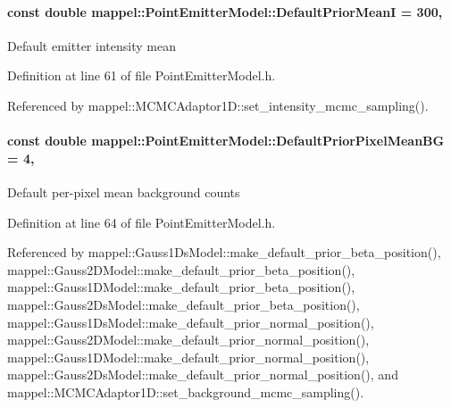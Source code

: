 \paragraph[{\texorpdfstring{Default\+Prior\+MeanI}{DefaultPriorMeanI}}]{\setlength{\rightskip}{0pt plus 5cm}const double mappel\+::\+Point\+Emitter\+Model\+::\+Default\+Prior\+MeanI = 300\hspace{0.3cm}{\ttfamily [static]}, {\ttfamily [inherited]}}\hypertarget{classmappel_1_1PointEmitterModel_a607fcdea787b0cc3c6ac8804d378d1b1}{}\label{classmappel_1_1PointEmitterModel_a607fcdea787b0cc3c6ac8804d378d1b1}
Default emitter intensity mean 

Definition at line 61 of file Point\+Emitter\+Model.\+h.



Referenced by mappel\+::\+M\+C\+M\+C\+Adaptor1\+D\+::set\+\_\+intensity\+\_\+mcmc\+\_\+sampling().

\paragraph[{\texorpdfstring{Default\+Prior\+Pixel\+Mean\+BG}{DefaultPriorPixelMeanBG}}]{\setlength{\rightskip}{0pt plus 5cm}const double mappel\+::\+Point\+Emitter\+Model\+::\+Default\+Prior\+Pixel\+Mean\+BG = 4\hspace{0.3cm}{\ttfamily [static]}, {\ttfamily [inherited]}}\hypertarget{classmappel_1_1PointEmitterModel_a72efb3ee01fa548683d510288266fea5}{}\label{classmappel_1_1PointEmitterModel_a72efb3ee01fa548683d510288266fea5}
Default per-\/pixel mean background counts 

Definition at line 64 of file Point\+Emitter\+Model.\+h.



Referenced by mappel\+::\+Gauss1\+Ds\+Model\+::make\+\_\+default\+\_\+prior\+\_\+beta\+\_\+position(), mappel\+::\+Gauss2\+D\+Model\+::make\+\_\+default\+\_\+prior\+\_\+beta\+\_\+position(), mappel\+::\+Gauss1\+D\+Model\+::make\+\_\+default\+\_\+prior\+\_\+beta\+\_\+position(), mappel\+::\+Gauss2\+Ds\+Model\+::make\+\_\+default\+\_\+prior\+\_\+beta\+\_\+position(), mappel\+::\+Gauss1\+Ds\+Model\+::make\+\_\+default\+\_\+prior\+\_\+normal\+\_\+position(), mappel\+::\+Gauss2\+D\+Model\+::make\+\_\+default\+\_\+prior\+\_\+normal\+\_\+position(), mappel\+::\+Gauss1\+D\+Model\+::make\+\_\+default\+\_\+prior\+\_\+normal\+\_\+position(), mappel\+::\+Gauss2\+Ds\+Model\+::make\+\_\+default\+\_\+prior\+\_\+normal\+\_\+position(), and mappel\+::\+M\+C\+M\+C\+Adaptor1\+D\+::set\+\_\+background\+\_\+mcmc\+\_\+sampling().

